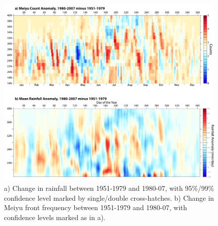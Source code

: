 \documentclass[draft,grl]{AGUTeX}
\begin{document}
\begin{figure}[htbp]
\begin{center}
\includegraphics[width=36pc]{Figures/fig3_changes.pdf}
\caption{a) Change in rainfall between 1951-1979 and 1980-07, with 95\%/99\% confidence level marked by single/double cross-hatches. b) Change in Meiyu front frequency between 1951-1979 and 1980-07, with confidence levels marked as in a).}
\label{changes}
\end{center}
\end{figure}
\end{document}
